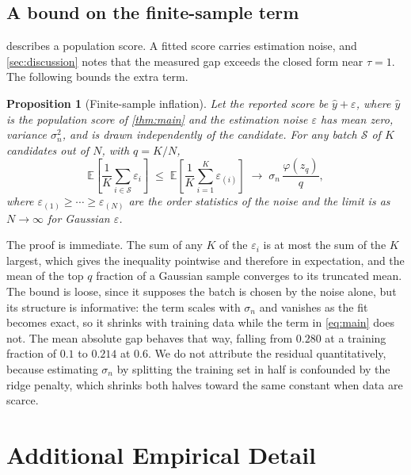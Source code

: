 \documentclass{article}
\theoremstyle{plain}
\newtheorem{proposition}[theorem]{Proposition}
\theoremstyle{definition}
\newcommand{\yhat}{\hat{y}}
\newcommand{\Exp}{\mathbb{E}}
\begin{document}
\subsection{A bound on the finite-sample term}
\label{app:finite}

 describes a population score. A fitted score carries estimation noise,
and \cref{sec:discussion} notes that the measured gap exceeds the closed form near
$\tau = 1$. The following bounds the extra term.

\begin{proposition}[Finite-sample inflation]
\label{prop:finite}
Let the reported score be $\yhat + \varepsilon$, where $\yhat$ is the population score
of \cref{thm:main} and the estimation noise $\varepsilon$ has mean zero, variance
$\sigma_n^2$, and is drawn independently of the candidate. For any batch $\mathcal{S}$
of $K$ candidates out of $N$, with $q = K/N$,
\begin{equation}
\Exp\!\left[\frac{1}{K}\sum_{i \in \mathcal{S}} \varepsilon_i\right]
\;\le\;
\Exp\!\left[\frac{1}{K}\sum_{i=1}^{K} \varepsilon_{(i)}\right]
\;\longrightarrow\;
\sigma_n\,\frac{\varphi(z_q)}{q},
\label{eq:finite}
\end{equation}
where $\varepsilon_{(1)} \ge \cdots \ge \varepsilon_{(N)}$ are the order statistics of
the noise and the limit is as $N \to \infty$ for Gaussian $\varepsilon$.
\end{proposition}

The proof is immediate. The sum of any $K$ of the $\varepsilon_i$ is at most the sum of
the $K$ largest, which gives the inequality pointwise and therefore in expectation, and
the mean of the top $q$ fraction of a Gaussian sample converges to its truncated mean.
The bound is loose, since it supposes the batch is chosen by the noise alone, but its
structure is informative: the term scales with $\sigma_n$ and vanishes as the fit
becomes exact, so it shrinks with training data while the term in \cref{eq:main} does
not. The mean absolute gap behaves that way, falling from $0.280$ at a training
fraction of $0.1$ to $0.214$ at $0.6$. We do not attribute the residual quantitatively,
because estimating $\sigma_n$ by splitting the training set in half is confounded by
the ridge penalty, which shrinks both halves toward the same constant when data are
scarce.

\section{Additional Empirical Detail}
\label{app:empirical}
\end{document}
